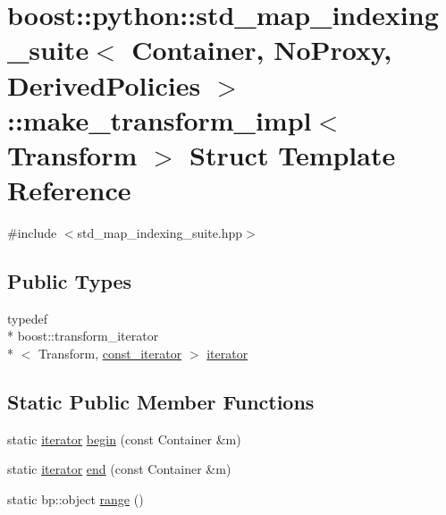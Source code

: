 \hypertarget{structboost_1_1python_1_1std__map__indexing__suite_1_1make__transform__impl}{\section{boost\-:\-:python\-:\-:std\-\_\-map\-\_\-indexing\-\_\-suite$<$ Container, No\-Proxy, Derived\-Policies $>$\-:\-:make\-\_\-transform\-\_\-impl$<$ Transform $>$ Struct Template Reference}
\label{structboost_1_1python_1_1std__map__indexing__suite_1_1make__transform__impl}
}


{\ttfamily \#include $<$std\-\_\-map\-\_\-indexing\-\_\-suite.\-hpp$>$}

\subsection*{Public Types}
\begin{DoxyCompactItemize}
\item 
typedef \\*
boost\-::transform\-\_\-iterator\\*
$<$ Transform, \hyperlink{classboost_1_1python_1_1std__map__indexing__suite_aae0c4473455223a4e048cc207ca7b3ea}{const\-\_\-iterator} $>$ \hyperlink{structboost_1_1python_1_1std__map__indexing__suite_1_1make__transform__impl_a64d7b60f0e792533c1cc89b84f341b0d}{iterator}
\end{DoxyCompactItemize}
\subsection*{Static Public Member Functions}
\begin{DoxyCompactItemize}
\item 
static \hyperlink{structboost_1_1python_1_1std__map__indexing__suite_1_1make__transform__impl_a64d7b60f0e792533c1cc89b84f341b0d}{iterator} \hyperlink{structboost_1_1python_1_1std__map__indexing__suite_1_1make__transform__impl_ab74967f0d94cdc5adcae986110974656}{begin} (const Container \&m)
\item 
static \hyperlink{structboost_1_1python_1_1std__map__indexing__suite_1_1make__transform__impl_a64d7b60f0e792533c1cc89b84f341b0d}{iterator} \hyperlink{structboost_1_1python_1_1std__map__indexing__suite_1_1make__transform__impl_ac8c3535052a0a3320e73ab5b49eb6b82}{end} (const Container \&m)
\item 
static bp\-::object \hyperlink{structboost_1_1python_1_1std__map__indexing__suite_1_1make__transform__impl_a9dbcd293bf92f94f2eaeaed8edb64ee2}{range} ()
\end{DoxyCompactItemize}


